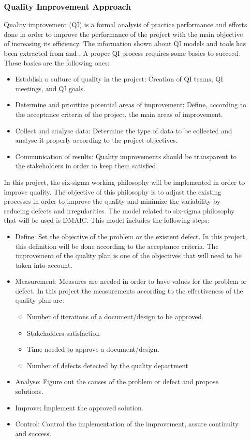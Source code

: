 \subsubsection{Quality Improvement Approach}
Quality improvement (QI) is a formal analysis of practice performance and efforts done in order to improve the performance of the project with the main objective of increasing its efficiency. The information shown about QI models and tools has been extracted from \cite{aafp} and \cite{leansolutions}. A proper QI process requires some basics to succeed. These basics are the following ones:
\begin{itemize}
\item Establish a culture of quality in the project: Creation of QI teams, QI meetings, and QI goals.
\item Determine and prioritize potential areas of improvement: Define, according to the acceptance criteria of the project, the main areas of improvement.
\item Collect and analyse data: Determine the type of data to be collected and analyse it properly according to the project objectives.
\item Communication of results: Quality improvements should be transparent to the stakeholders in order to keep them satisfied. 
\end{itemize}
In this project, the six-sigma working philosophy will be implemented in order to improve quality. The objective of this philosophy is to adjust the existing processes in order to improve the quality and minimize the variability by reducing defects and irregularities. The model related to six-sigma philosophy that will be used is DMAIC. This model includes the following steps:
\begin{itemize}
\item Define: Set the objective of the problem or the existent defect. In this project, this definition will be done according to the acceptance criteria. The improvement of the quality plan is one of the objectives that will need to be taken into account.
\item Measurement: Measures are needed in order to have values for the problem or defect. In this project the measurements according to the effectiveness of the quality plan are:
\begin{itemize}
\item Number of iterations of a document/design to be approved.
\item Stakeholders satisfaction
\item Time needed to approve a document/design.
\item Number of defects detected by the quality department 
\end{itemize}
\item Analyse: Figure out the causes of the problem or defect and propose solutions.
\item Improve: Implement the approved solution.
\item Control: Control the implementation of the improvement, assure continuity and success.
\end{itemize}